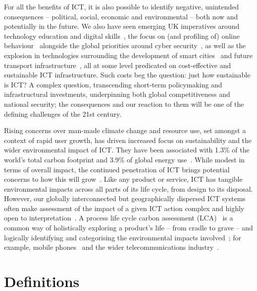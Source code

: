 \documentclass[conference]{IEEEtran}
\begin{document}
For all the benefits of ICT, it is also possible to identify negative,
unintended consequences -- political, social, economic and
environmental -- both now and potentially in the future. We also have
seen emerging UK imperatives around technology education and digital
skills~\cite{brown-et-al-toce2014}, the focus on (and profiling of)
online behaviour~\cite{oatley+crick:2014} alongside the global
priorities around cyber security~\cite{carr+crick-csss2015}, as well
as the explosion in technologies surrounding the development of smart
cities~\cite{cosgrave-et-al:2014} and future transport
infrastructure~\cite{cooper-et-al-sose}, all at some level predicated
on cost-effective and sustainable ICT infrastructure. Such costs beg
the question: just how sustainable is ICT? A complex question,
transcending short-term policymaking and infrastructural investments,
underpinning both global competitiveness and national security; the
consequences and our reaction to them will be one of the defining
challenges of the 21st century.

Rising concerns over man-made climate change and resource use, set
amongst a context of rapid user growth, has driven increased focus on
sustainability and the wider environmental impact of ICT. They have
been associated with 1.3\% of the world's total carbon footprint and
3.9\% of global energy use~\cite{plepys:2002}. While modest in terms
of overall impact, the continued penetration of ICT brings potential
concerns to how this will grow~\cite{yi+thomas:2007}. Like any product
or service, ICT has tangible environmental impacts across all parts of
its life cycle, from design to its disposal. However, our globally
interconnected but geographically dispersed ICT systems often make
assessment of the impact of a given ICT action complex and highly open
to interpretation~\cite{andrae+andersen:2010}. A process life cycle
carbon assessment
(LCA)~\cite{baumann+tillman:2004,iso14040:2006,bsi2050:2011} is a
common way of holistically exploring a product's life -- from cradle
to grave -- and logically identifying and categorising the
environmental impacts involved~\cite{malmodin-et-al:2014}; for
example, mobile phones~\cite{frey-et-al:2008,fehske:2011} and the
wider telecommunications industry~\cite{scharnhorst:2008}.

\section{Definitions}
\end{document}
